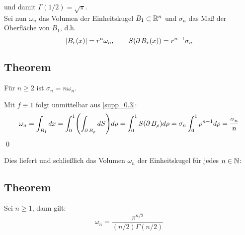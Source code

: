 	und damit $\Gamma(1/2) = \sqrt{\pi}$. \\
	Sei nun $\omega_n$ das Volumen der Einheitskugel $B_1 \subset \mathbb{R}^n$ und $\sigma_n$ das Maß der Oberfläche von $B_1$, d.h.
	\begin{equation}
		|B_r(x)| = r^n \omega_n, \qquad S(\operatorname{\partial} B_r(x)) = r^{n-1} \sigma_n \label{supp_0.7}
	\end{equation}
	
\subsection{Theorem}
\label{supp_2.1}
	Für $n \geq 2$ ist $\sigma_n = n \omega_n$.
	
	Mit $f \equiv 1$ folgt unmittelbar aus \eqref{supp_0.3}:
	\[	\omega_n = \int_{B_1} dx = \int_{0}^{1} \enbrace*{ \int_{\der B_\rho} dS} d\rho = \int_{0}^{1} S(\der B_\rho) d\rho = \sigma_n \int_0^1 \rho^{n-1} d\rho = \frac{\sigma_n}{n} \] \qed
	
Dies liefert und schließlich das Volumen $\omega_n$ der Einheitskugel für jedes $n \in \mathbb{N}$:

\subsection{Theorem}
\label{supp_2.2}
	Sei $n \geq 1$, dann gilt:
	\begin{equation} 
		\omega_n = \frac{\pi^{n/2}}{(n/2) \Gamma (n/2)} \label{supp_0.8} 
	\end{equation}
	
